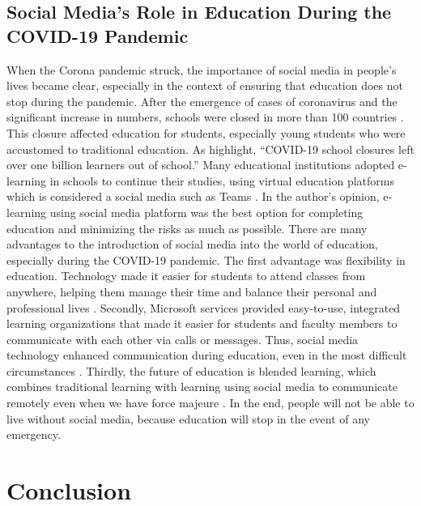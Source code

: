 \documentclass{article}
\begin{document}
\subsection{Social Media's Role in Education During the COVID-19 Pandemic}
When the Corona pandemic struck, the importance of social media in people's lives became clear, especially in the context of ensuring that education does not stop during the pandemic. After the emergence of cases of coronavirus and the significant increase in numbers, schools were closed in more than 100 countries \citep[cited in][]{onyema2020}. This closure affected education for students, especially young students who were accustomed to traditional education. As \citet[p.1]{onyema2020} highlight, ``COVID-19 school closures left over one billion learners out of school.'' Many educational institutions adopted e-learning in schools to continue their studies, using virtual education platforms which is considered a social media such as Teams \citep{onyema2020}. In the author's opinion, e-learning using social media platform was the best option for completing education and minimizing the risks as much as possible. There are many advantages to the introduction of social media into the world of education, especially during the COVID-19 pandemic. The first advantage was flexibility in education. Technology made it easier for students to attend classes from anywhere, helping them manage their time and balance their personal and professional lives \citep{moise2021}. Secondly, Microsoft services provided easy-to-use, integrated learning organizations that made it easier for students and faculty members to communicate with each other via calls or messages. Thus, social media technology enhanced communication during education, even in the most difficult circumstances \citep{moise2021}. Thirdly, the future of education is blended learning, which combines traditional learning with learning using social media to communicate remotely even when we have force majeure \citep{moise2021}. In the end, people will not be able to live without social media, because education will stop in the event of any emergency.
\newpage
\section{Conclusion}




\end{document}
